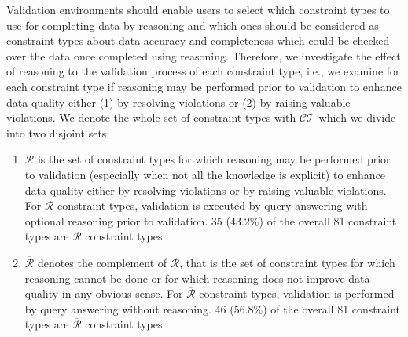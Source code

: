 \documentclass{acm_proc_article-sp}
\begin{document}


Validation environments should enable users to select which constraint types to use for completing data by reasoning 
and which ones should be considered as constraint types about data accuracy and completeness which could be checked over the data once completed using reasoning.
Therefore, we investigate the effect of reasoning to the validation process of each constraint type, i.e.,
we examine for each constraint type if reasoning may be performed prior to validation to enhance data quality
either (1) by resolving violations or (2) by raising valuable violations.
We denote the whole set of constraint types with $\mathcal{CT}$ which we divide into two disjoint sets: 
\begin{enumerate}
\item $\mathcal{R}$ is the set of constraint types for which reasoning may be performed prior to validation (especially when not all the knowledge is explicit) to enhance data quality
either by resolving violations or by raising valuable violations.
For $\mathcal{R}$ constraint types, validation is executed by query answering with optional reasoning prior to validation.
35 (43.2\%) of the overall 81 constraint types are $\mathcal{R}$ constraint types.
\item $\overline{\mathcal{R}}$  denotes the complement of $\mathcal{R}$, that is the set of constraint types 
for which reasoning cannot be done or for which reasoning does not improve data quality in any obvious sense.
For $\overline{\mathcal{R}}$ constraint types, validation is performed by query answering without reasoning.
46 (56.8\%) of the overall 81 constraint types are $\overline{\mathcal{R}}$ constraint types.
\end{enumerate}
\end{document}
